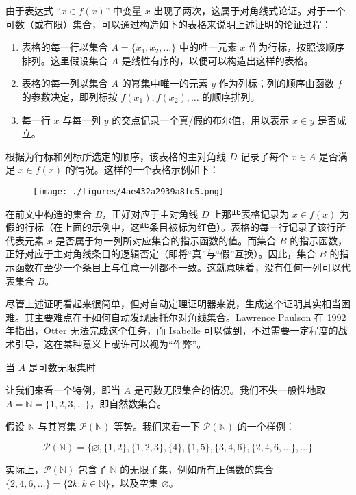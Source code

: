 由于表达式 “$x \in f(x)$” 中变量 $x$ 出现了两次，这属于对角线式论证。对于一个可数（或有限）集合，可以通过构造如下的表格来说明上述证明的论证过程：
\begin{enumerate}
\item 表格的每一行以集合 $A = \{x_1, x_2, \ldots\}$ 中的唯一元素 $x$ 作为行标，按照该顺序排列。这里假设集合 $A$ 是线性有序的，以便可以构造出这样的表格。
\item 表格的每一列以集合 $A$ 的幂集中唯一的元素 $y$ 作为列标；列的顺序由函数 $f$ 的参数决定，即列标按 $f(x_1), f(x_2), \ldots$ 的顺序排列。
\item 每一行 $x$ 与每一列 $y$ 的交点记录一个真/假的布尔值，用以表示 $x \in y$ 是否成立。
\end{enumerate}
根据为行标和列标所选定的顺序，该表格的主对角线 $D$ 记录了每个 $x \in A$ 是否满足 $x \in f(x)$ 的情况。这样的一个表格示例如下：
\begin{figure}[ht]
\centering
\texttt{[image: ./figures/4ae432a2939a8fc5.png]}
\caption{} \label{fig_KTDL_2}
\end{figure}
在前文中构造的集合 $B$，正好对应于主对角线 $D$ 上那些表格记录为 $x \in f(x)$ 为假的行标（在上面的示例中，这些条目被标为红色）。表格的每一行记录了该行所代表元素 $x$ 是否属于每一列所对应集合的指示函数的值。而集合 $B$ 的指示函数，正好对应于主对角线条目的逻辑否定（即将“真”与“假”互换）。因此，集合 $B$ 的指示函数在至少一个条目上与任意一列都不一致。这就意味着，没有任何一列可以代表集合 $B$。

尽管上述证明看起来很简单，但对自动定理证明器来说，生成这个证明其实相当困难。其主要难点在于如何自动发现康托尔对角线集合。Lawrence Paulson 在 1992 年指出，Otter 无法完成这个任务，而 Isabelle 可以做到，不过需要一定程度的战术引导，这在某种意义上或许可以视为“作弊”。

当 $A$ 是可数无限集时

让我们来看一个特例，即当 $A$ 是可数无限集合的情况。我们不失一般性地取 $A = \mathbb{N} = \{1, 2, 3, \ldots\}$，即自然数集合。

假设 $\mathbb{N}$ 与其幂集 $\mathcal{P}(\mathbb{N})$ 等势。我们来看一下 $\mathcal{P}(\mathbb{N})$ 的一个样例：

$$
\mathcal{P}(\mathbb{N}) = \{\varnothing, \{1,2\}, \{1,2,3\}, \{4\}, \{1,5\}, \{3,4,6\}, \{2,4,6,\dots\}, \dots\}
$$

实际上，$\mathcal{P}(\mathbb{N})$ 包含了 $\mathbb{N}$ 的无限子集，例如所有正偶数的集合 $\{2, 4, 6, \ldots\} = \{2k : k \in \mathbb{N} \}$，以及空集 $\varnothing$。
